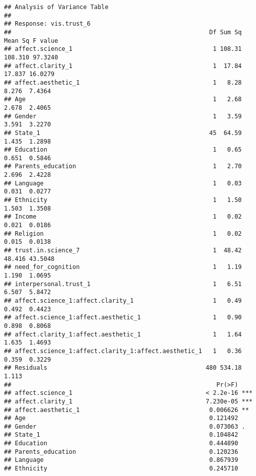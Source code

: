 \documentclass[
]{article}
\begin{document}
\begin{verbatim}
## Analysis of Variance Table
## 
## Response: vis.trust_6
##                                                       Df Sum Sq Mean Sq F value
## affect.science_1                                       1 108.31 108.310 97.3240
## affect.clarity_1                                       1  17.84  17.837 16.0279
## affect.aesthetic_1                                     1   8.28   8.276  7.4364
## Age                                                    1   2.68   2.678  2.4065
## Gender                                                 1   3.59   3.591  3.2270
## State_1                                               45  64.59   1.435  1.2898
## Education                                              1   0.65   0.651  0.5846
## Parents_education                                      1   2.70   2.696  2.4228
## Language                                               1   0.03   0.031  0.0277
## Ethnicity                                              1   1.50   1.503  1.3508
## Income                                                 1   0.02   0.021  0.0186
## Religion                                               1   0.02   0.015  0.0138
## trust.in.science_7                                     1  48.42  48.416 43.5048
## need_for_cognition                                     1   1.19   1.190  1.0695
## interpersonal.trust_1                                  1   6.51   6.507  5.8472
## affect.science_1:affect.clarity_1                      1   0.49   0.492  0.4423
## affect.science_1:affect.aesthetic_1                    1   0.90   0.898  0.8068
## affect.clarity_1:affect.aesthetic_1                    1   1.64   1.635  1.4693
## affect.science_1:affect.clarity_1:affect.aesthetic_1   1   0.36   0.359  0.3229
## Residuals                                            480 534.18   1.113        
##                                                         Pr(>F)    
## affect.science_1                                     < 2.2e-16 ***
## affect.clarity_1                                     7.230e-05 ***
## affect.aesthetic_1                                    0.006626 ** 
## Age                                                   0.121492    
## Gender                                                0.073063 .  
## State_1                                               0.104842    
## Education                                             0.444890    
## Parents_education                                     0.120236    
## Language                                              0.867939    
## Ethnicity                                             0.245710    

\end{verbatim}
\end{document}
